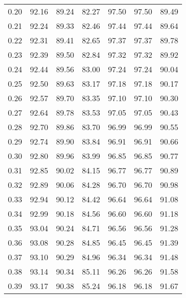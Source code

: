 \begin{tabular}{|c|c|c|c|c|c|c|}
      0.20 &     92.16 &     89.24 &      82.27 &   97.50 &      97.50 &         89.49 \\
      0.21 &     92.24 &     89.33 &      82.46 &   97.44 &      97.44 &         89.64 \\
      0.22 &     92.31 &     89.41 &      82.65 &   97.37 &      97.37 &         89.78 \\
      0.23 &     92.39 &     89.50 &      82.84 &   97.32 &      97.32 &         89.92 \\
      0.24 &     92.44 &     89.56 &      83.00 &   97.24 &      97.24 &         90.04 \\
      0.25 &     92.50 &     89.63 &      83.17 &   97.18 &      97.18 &         90.17 \\
      0.26 &     92.57 &     89.70 &      83.35 &   97.10 &      97.10 &         90.30 \\
      0.27 &     92.64 &     89.78 &      83.53 &   97.05 &      97.05 &         90.43 \\
      0.28 &     92.70 &     89.86 &      83.70 &   96.99 &      96.99 &         90.55 \\
      0.29 &     92.74 &     89.90 &      83.84 &   96.91 &      96.91 &         90.66 \\
      0.30 &     92.80 &     89.96 &      83.99 &   96.85 &      96.85 &         90.77 \\
      0.31 &     92.85 &     90.02 &      84.15 &   96.77 &      96.77 &         90.89 \\
      0.32 &     92.89 &     90.06 &      84.28 &   96.70 &      96.70 &         90.98 \\
      0.33 &     92.94 &     90.12 &      84.42 &   96.64 &      96.64 &         91.08 \\
      0.34 &     92.99 &     90.18 &      84.56 &   96.60 &      96.60 &         91.18 \\
      0.35 &     93.04 &     90.24 &      84.71 &   96.56 &      96.56 &         91.28 \\
      0.36 &     93.08 &     90.28 &      84.85 &   96.45 &      96.45 &         91.39 \\
      0.37 &     93.10 &     90.29 &      84.96 &   96.34 &      96.34 &         91.48 \\
      0.38 &     93.14 &     90.34 &      85.11 &   96.26 &      96.26 &         91.58 \\
      0.39 &     93.17 &     90.38 &      85.24 &   96.18 &      96.18 &         91.67 \\

\end{tabular}
